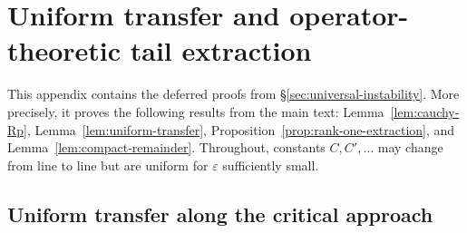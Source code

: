\documentclass[11pt]{amsart}
\numberwithin{equation}{section}
\theoremstyle{plain}
\theoremstyle{definition}
\theoremstyle{remark}
\begin{document}
\section{Uniform transfer and operator-theoretic tail extraction}
\label{app:gram-bounds}

This appendix contains the deferred proofs from
\S\ref{sec:universal-instability}. More precisely, it proves the following
results from the main text: Lemma~\ref{lem:cauchy-Rp},
Lemma~\ref{lem:uniform-transfer}, Proposition~\ref{prop:rank-one-extraction},
and Lemma~\ref{lem:compact-remainder}. Throughout, constants \(C,C',\dots\) may
change from line to line but are uniform for \(\varepsilon\) sufficiently
small.

\subsection{Uniform transfer along the critical approach}
\end{document}
